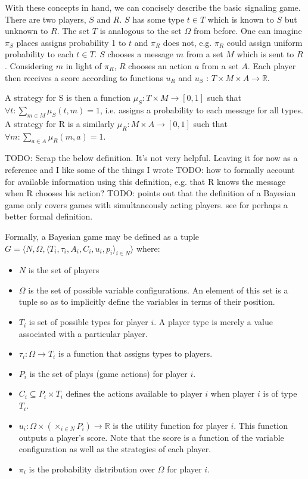 \documentclass{article}
\begin{document}
With these concepts in hand, we can concisely describe the basic signaling game. There are two players, $S$ and $R$. $S$ has some type $t \in T$ which is known to $S$ but unknown to $R$. The set $T$ is analogous to the set $\Omega$ from before. One can imagine $\pi_{S}$ places assigns probability 1 to $t$ and $\pi_{R}$ does not, e.g. $\pi_{R}$ could assign uniform probability to each $t \in T$. $S$ chooses a message $m$ from a set $M$ which is sent to $R$. Considering $m$ in light of $\pi_R$, $R$ chooses an action $a$ from a set $A$. Each player then receives a score according to functions $u_R$ and $u_S$ : $T \times M \times A \to \mathbb{R}$.

A strategy for S is then a function $\mu_{S}: T \times M \to [0,1]$ such that $\forall t: \sum_{m \in M} \mu_{S}(t, m) = 1$, i.e. assigns a probability to each message for all types. A strategy for R is a similarly $\mu_{R} : M \times A \to [0,1]$ such that $\forall m: \sum_{a \in A} \mu_{R}(m,a) = 1$.

TODO: Scrap the below definition. It's not very helpful. Leaving it for now as a reference and I like some of the things I wrote
TODO: how to formally account for available information using this definition, e.g. that R knows the message when R chooses his action?
TODO: \cite{nurmi1} points out that the definition of a Bayesian game only covers games with simultaneously acting players. see \cite{fudenberg1} for perhaps a better formal definition.

Formally, a Bayesian game may be defined as a tuple $ G = \langle N, \Omega, \langle T_{i}, \tau_{i}, A_{i}, C_{i}, u_{i}, p_{i} \rangle _{i \in N} \rangle $ where:

\begin{itemize}
\item $N$ is the set of players
\item $\Omega$ is the set of possible variable configurations. An element of this set is a tuple so as to implicitly define the variables in terms of their position.
\item $T_{i}$ is set of possible types for player $i$. A player type is merely a value associated with a particular player.
\item $\tau_{i}:\Omega \to T_{i}$ is a function that assigns types to players.
\item $P_{i}$ is the set of plays (game actions) for player $i$.
\item $C_{i} \subseteq P_{i} \times T_{i}$ defines the actions available to player $i$ when player $i$ is of type $T_{i}$. 
\item $u_i:\Omega \times (\times_{i \in N} P_{i}) \to \mathbb{R}$ is the utility function for player $i$. This function outputs a player's score. Note that the score is a function of the variable configuration as well as the strategies of each player.
\item $\pi_{i}$ is the probability distribution over $\Omega$ for player $i$.
\end{itemize}
\end{document}
